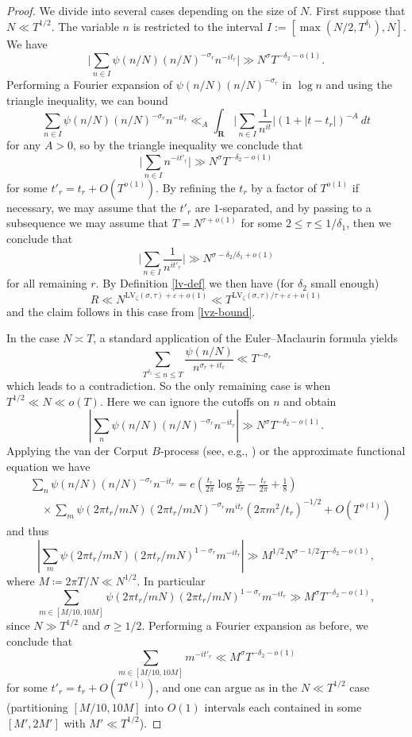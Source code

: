 \documentclass[a4paper, 10pt]{amsart}
\newcommand{\eps}{\varepsilon}
\newcommand{\R}{\mathbf{R}}
\newcommand{\LV}{\mathrm{LV}}
\begin{document}
\begin{proof}
    We divide into several cases depending on the size of $N$.  First suppose that $N \ll T^{1/2}$.  The variable $n$ is restricted to the interval $I := [\max(N/2, T^{\delta_1}), N]$.  We have
    $$ \bigg|\sum_{n \in I} \psi(n/N) (n/N)^{-\sigma_r} n^{-it_r} \bigg| \gg N^\sigma T^{-\delta_2 - o(1)}.$$
    Performing a Fourier expansion of $\psi(n/N) (n/N)^{-\sigma_r}$ in $\log n$ and using the triangle inequality, we can bound
    $$ \sum_{n \in I} \psi(n/N) (n/N)^{-\sigma_r} n^{-it_r}  \ll_A \int_\R \bigg| \sum_{n \in I} \frac{1}{n^{it}} \bigg| (1+|t-t_r|)^{-A}\ dt$$
    for any $A>0$, so by the triangle inequality we conclude that
    $$ \bigg|\sum_{n \in I} n^{-it'_r} \bigg| \gg N^\sigma T^{-\delta_2 - o(1)}$$
    for some $t'_r = t_r + O(T^{o(1)})$.  By refining the $t_r$ by a factor of $T^{o(1)}$ if necessary, we may assume that the $t'_r$ are $1$-separated, and by passing to a subsequence we may assume that $T = N^{\tau+o(1)}$ for some $2 \leq \tau \leq 1/\delta_1$, then
    we conclude that
    $$ \bigg| \sum_{n \in I} \frac{1}{n^{it'_r}} \bigg| \gg N^{\sigma-\delta_2/\delta_1+o(1)}$$
    for all remaining $r$.  By Definition \ref{lv-def} we then have (for $\delta_2$ small enough)
    $$ R \ll N^{\LV_\zeta(\sigma,\tau) + \eps + o(1)} \ll T^{\LV_\zeta(\sigma,\tau)/\tau + \eps + o(1)}$$
    and the claim follows in this case from \eqref{lvz-bound}.

    In the case $N \asymp T$, a standard application of the Euler--Maclaurin formula 
yields
    $$ \sum_{T^{\delta_1} \leq n \leq T} \frac{\psi(n/N)}{n^{\sigma_r+it_r}} \ll T^{-\sigma_r}$$
    which leads to a contradiction.  So the only remaining case is when $T^{1/2} \ll N \ll o(T)$.  Here we can ignore the cutoffs on $n$ and obtain
    $$ \left| \sum_{n} \psi(n/N) (n/N)^{-\sigma_r} n^{-it_r}\right| \gg N^{\sigma} T^{-\delta_2-o(1)}.$$
    Applying the van der Corput $B$-process (see, e.g., \cite[\S 8.3]{ik}) or the approximate functional equation we have
\begin{align*}
    &\sum_{n} \psi(n/N) (n/N)^{-\sigma_r} n^{-it_r} = e\left(\frac{t_r}{2\pi} \log \frac{t_r}{2\pi} - \frac{t_r}{2\pi} + \frac{1}{8}\right)\\
    &\quad \times \sum_{m} \psi(2\pi t_r/mN) (2\pi t_r/mN)^{-\sigma_r} m^{it_r} (2\pi m^2/t_r)^{-1/2} + O(T^{o(1)})
\end{align*}
and thus
    $$ \left| \sum_{m} \psi(2\pi t_r/mN) (2\pi t_r/mN)^{1-\sigma_r} m^{-it_r} \right| \gg M^{1/2} N^{\sigma-1/2} T^{-\delta_2-o(1)},$$
    where $M \coloneqq 2\pi T/N \ll N^{1/2}$.  In particular
    $$ \sum_{m \in [M/10, 10 M]} \psi(2\pi t_r/mN) (2\pi t_r/mN)^{1-\sigma_r} m^{-it_r} \gg M^{\sigma} T^{-\delta_2-o(1)},$$
    since $N \gg T^{1/2}$ and $\sigma \geq 1/2$.  Performing a Fourier expansion as before, we conclude that
    $$ \sum_{m \in [M/10, 10 M]} m^{-it'_r} \ll M^{\sigma} T^{-\delta_2-o(1)}$$
    for some $t'_r = t_r + O(T^{o(1)})$, and one can argue as in the $N \ll T^{1/2}$ case (partitioning $[M/10, 10M]$ into $O(1)$ intervals each contained in some $[M',2M']$ with $M' \ll T^{1/2}$).


\end{proof}
\end{document}
